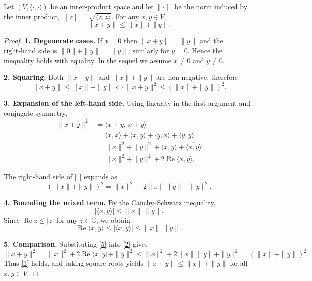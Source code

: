 \begin{theorem}
Let $(V,\langle\cdot,\cdot\rangle)$ be an inner‑product space and let $\|\cdot\|$ be the norm induced by the inner product, $\|z\|=\sqrt{\langle z,z\rangle}$.  
For any $x,y\in V$,
\[
\|x+y\|\le \|x\|+\|y\|.
\]
\end{theorem}

\begin{proof}
\textbf{1. Degenerate cases.}  
If $x=0$ then $\|x+y\|=\|y\|$ and the right‑hand side is $\|0\|+\|y\|=\|y\|$; similarly for $y=0$. Hence the inequality holds with equality. In the sequel we assume $x\neq0$ and $y\neq0$.

\medskip\noindent\textbf{2. Squaring.}  
Both $\|x+y\|$ and $\|x\|+\|y\|$ are non‑negative, therefore
\begin{equation}
\|x+y\|\le\|x\|+\|y\|\iff
\|x+y\|^{2}\le(\|x\|+\|y\|)^{2}.
\tag{1}
\end{equation}

\medskip\noindent\textbf{3. Expansion of the left‑hand side.}  
Using linearity in the first argument and conjugate symmetry,
\begin{align*}
\|x+y\|^{2}
&=\langle x+y,\,x+y\rangle\\
&=\langle x,x\rangle+\langle x,y\rangle+\langle y,x\rangle+\langle y,y\rangle\\
&=\|x\|^{2}+\|y\|^{2}+ \langle x,y\rangle+\overline{\langle x,y\rangle}\\
&=\|x\|^{2}+\|y\|^{2}+2\operatorname{Re}\langle x,y\rangle .
\end{align*}
\]

The right‑hand side of \eqref{1} expands as
\begin{equation}
(\|x\|+\|y\|)^{2}= \|x\|^{2}+2\|x\|\|y\|+\|y\|^{2}.
\tag{3}
\end{equation}

\medskip\noindent\textbf{4. Bounding the mixed term.}  
By the Cauchy–Schwarz inequality,
\begin{equation}
|\langle x,y\rangle|\le\|x\|\,\|y\|.
\tag{4}
\end{equation}
Since $\operatorname{Re}z\le|z|$ for any $z\in\mathbb{C}$, we obtain
\begin{equation}
\operatorname{Re}\langle x,y\rangle\le|\langle x,y\rangle|\le\|x\|\,\|y\|.
\tag{5}
\end{equation}

\medskip\noindent\textbf{5. Comparison.}  
Substituting \eqref{5} into \eqref{2} gives
\[
\|x+y\|^{2}
=\|x\|^{2}+2\operatorname{Re}\langle x,y\rangle+\|y\|^{2}
\le\|x\|^{2}+2\|x\|\|y\|+\|y\|^{2}
=(\|x\|+\|y\|)^{2}.
\]
Thus \eqref{1} holds, and taking square roots yields $\|x+y\|\le\|x\|+\|y\|$ for all $x,y\in V$.


\end{proof}
